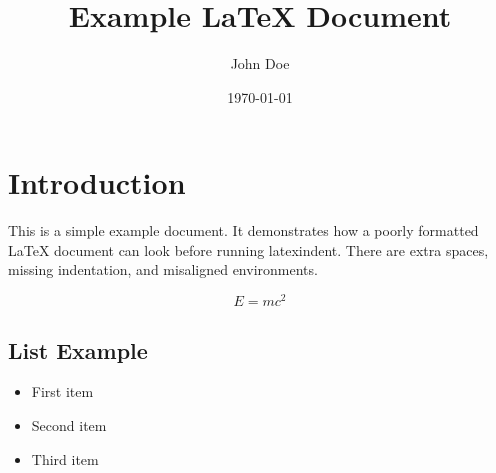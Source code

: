 \documentclass{article}
\begin{document}
\title{Example LaTeX Document}\author{John Doe}
\date{\today}
\maketitle

\section{Introduction}
This is a simple example document.
It demonstrates how a poorly formatted LaTeX document can look before running latexindent.
There are extra spaces, missing indentation, and misaligned environments.

\begin{equation}
    E = mc^2
\end{equation}

\subsection{List Example}
\begin{itemize}
    \item First item
    \item Second item
    \item Third item
\end{itemize}
\end{document}
